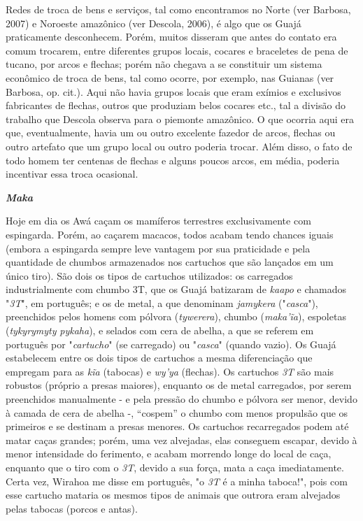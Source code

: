 Redes de troca de bens e serviços, tal como encontramos no Norte (ver
Barbosa, 2007) e Noroeste amazônico (ver Descola, 2006), é algo que os
Guajá praticamente desconhecem. Porém, muitos disseram que antes do
contato era comum trocarem, entre diferentes grupos locais, cocares e
braceletes de pena de tucano, por arcos e flechas; porém não chegava a
se constituir um sistema econômico de troca de bens, tal como ocorre,
por exemplo, nas Guianas (ver Barbosa, op. cit.). Aqui não havia grupos
locais que eram exímios e exclusivos fabricantes de flechas, outros que
produziam belos cocares etc., tal a divisão do trabalho que Descola
observa para o piemonte amazônico. O que ocorria aqui era que,
eventualmente, havia um ou outro excelente fazedor de arcos, flechas ou
outro artefato que um grupo local ou outro poderia trocar. Além disso, o
fato de todo homem ter centenas de flechas e alguns poucos arcos, em
média, poderia incentivar essa troca ocasional.

\textbf{\emph{Maka}}

Hoje em dia os Awá caçam os mamíferos terrestres exclusivamente com
espingarda. Porém, ao caçarem macacos, todos acabam tendo chances iguais
(embora a espingarda sempre leve vantagem por sua praticidade e pela
quantidade de chumbos armazenados nos cartuchos que são lançados em um
único tiro). São dois os tipos de cartuchos utilizados: os carregados
industrialmente com chumbo 3T, que os Guajá batizaram de \emph{kaapo} e
chamados "\emph{3T}", em português; e os de metal, a que denominam
\emph{jamykera} ("\emph{casca}"), preenchidos pelos homens com pólvora
(\emph{tywerera}), chumbo (\emph{maka'ĩa}), espoletas (\emph{tykyrymyty}
\emph{pykaha}), e selados com cera de abelha, a que se referem em
português por "\emph{cartucho}" (se carregado) ou "\emph{casca}" (quando
vazio). Os Guajá estabelecem entre os dois tipos de cartuchos a mesma
diferenciação que empregam para as \emph{kĩa} (tabocas) e \emph{wy'ya}
(flechas). Os cartuchos \emph{3T} são mais robustos (próprio a presas
maiores), enquanto os de metal carregados, por serem preenchidos
manualmente - e pela pressão do chumbo e pólvora ser menor, devido à
camada de cera de abelha -, ``cospem'' o chumbo com menos propulsão que
os primeiros e se destinam a presas menores. Os cartuchos recarregados
podem até matar caças grandes; porém, uma vez alvejadas, elas conseguem
escapar, devido à menor intensidade do ferimento, e acabam morrendo
longe do local de caça, enquanto que o tiro com o \emph{3T}, devido a
sua força, mata a caça imediatamente. Certa vez, Wirahoa me disse em
português, "o \emph{3T} é a minha taboca!", pois com esse cartucho
mataria os mesmos tipos de animais que outrora eram alvejados pelas
tabocas (porcos e antas).

